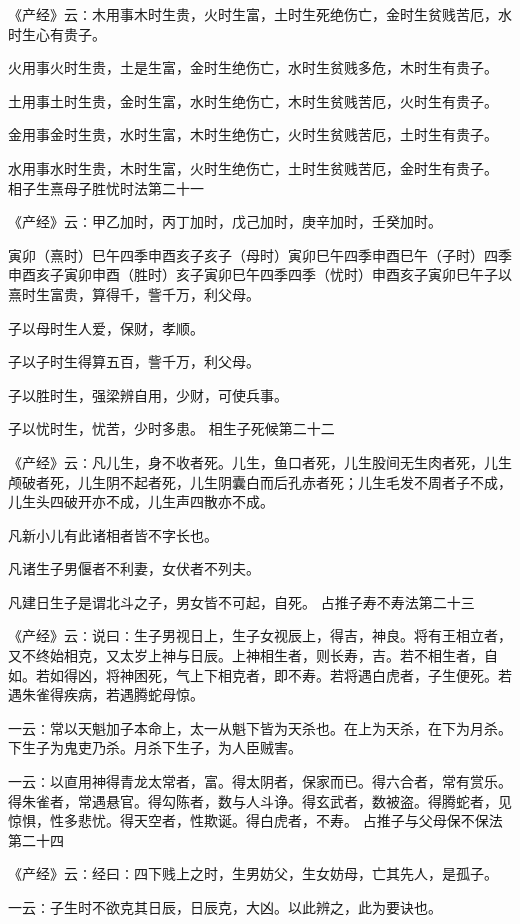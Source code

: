 \documentclass[a4paper,12pt,UTF8,twoside]{ctexbook}
\begin{document}
《产经》云∶木用事木时生贵，火时生富，土时生死绝伤亡，金时生贫贱苦厄，水时生心有贵子。

火用事火时生贵，土是生富，金时生绝伤亡，水时生贫贱多危，木时生有贵子。

土用事土时生贵，金时生富，水时生绝伤亡，木时生贫贱苦厄，火时生有贵子。

金用事金时生贵，水时生富，木时生绝伤亡，火时生贫贱苦厄，土时生有贵子。

水用事水时生贵，木时生富，火时生绝伤亡，土时生贫贱苦厄，金时生有贵子。
相子生熹母子胜忧时法第二十一

《产经》云∶甲乙加时，丙丁加时，戊己加时，庚辛加时，壬癸加时。

寅卯（熹时）巳午四季申酉亥子亥子（母时）寅卯巳午四季申酉巳午（子时）四季申酉亥子寅卯申酉（胜时）亥子寅卯巳午四季四季（忧时）申酉亥子寅卯巳午子以熹时生富贵，算得千，訾千万，利父母。

子以母时生人爱，保财，孝顺。

子以子时生得算五百，訾千万，利父母。

子以胜时生，强梁辨自用，少财，可使兵事。

子以忧时生，忧苦，少时多患。
相生子死候第二十二

《产经》云∶凡儿生，身不收者死。儿生，鱼口者死，儿生股间无生肉者死，儿生颅破者死，儿生阴不起者死，儿生阴囊白而后孔赤者死；儿生毛发不周者子不成，儿生头四破开亦不成，儿生声四散亦不成。

凡新小儿有此诸相者皆不字长也。

凡诸生子男偃者不利妻，女伏者不列夫。

凡建日生子是谓北斗之子，男女皆不可起，自死。
占推子寿不寿法第二十三

《产经》云∶说曰∶生子男视日上，生子女视辰上，得吉，神良。将有王相立者，又不终始相克，又太岁上神与日辰。上神相生者，则长寿，吉。若不相生者，自如。若如得凶，将神困死，气上下相克者，即不寿。若将遇白虎者，子生便死。若遇朱雀得疾病，若遇腾蛇母惊。

一云∶常以天魁加子本命上，太一从魁下皆为天杀也。在上为天杀，在下为月杀。下生子为鬼吏乃杀。月杀下生子，为人臣贼害。

一云∶以直用神得青龙太常者，富。得太阴者，保家而已。得六合者，常有赏乐。得朱雀者，常遇悬官。得勾陈者，数与人斗诤。得玄武者，数被盗。得腾蛇者，见惊惧，性多悲忧。得天空者，性欺诞。得白虎者，不寿。
占推子与父母保不保法第二十四

《产经》云∶经曰∶四下贱上之时，生男妨父，生女妨母，亡其先人，是孤子。

一云∶子生时不欲克其日辰，日辰克，大凶。以此辨之，此为要诀也。
\end{document}
